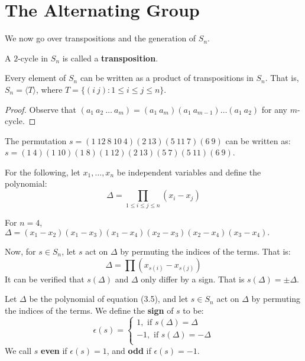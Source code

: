 \section{The Alternating Group}
\label{section_3.6}

We now go over transpositions and the generation of $S_n$.

\begin{definition}
  A $2$-cycle in  $S_n$ is called a \textbf{transposition}.
\end{definition}

\begin{lemma}\label{lemma_3.6.1}
  Every element of $S_n$ can be written as a product of transpositions in
  $S_n$. That is,  $S_n=\langle T \rangle $, where $T=\{(i \ j) : 1 \leq i \leq j \leq
  n\}$.
\end{lemma}
\begin{proof}
  Observe that $(a_1 \ a_2 \ \dots \ a_m)=(a_1 \ a_m)(a_1 \ a_{m-1}) \dots
  (a_1 \ a_2)$ for any $m$-cycle.
\end{proof}

\begin{example}\label{example_3.11}
  The permutation $s=(1 \ 12 \ 8  \ 10 \ 4)(2 \ 13)(5 \ 11 \ 7)(6 \ 9)$ can be
  written as: $s=(1 \ 4)(1 \ 10)(1 \ 8)(1 \ 12)(2 \ 13)(5 \ 7)(5 \ 11)(6 \
  9)$.
\end{example}

For the following, let $x_1, \dots, x_n$ be independent variables and define the
polynomial:
\begin{equation}
  \Delta=\prod_{1 \leq i \leq j \leq n}{(x_i-x_j)}
\end{equation}

\begin{example}\label{example_3.12}
  For $n=4$,  $\Delta=(x_1-x_2)(x_1-x_3)(x_1-x_4)(x_2-x_3)(x_2-x_4)(x_3-x_4).$
\end{example}

Now, for $s \in S_n$, let $s$ act on  $\Delta$ by permuting the indices of the
terms. That is:
\begin{equation*}
  \Delta=\prod{(x_{s(i)}-x_{s(j)})}
\end{equation*}
It can be verified that $s(\Delta)$ and $\Delta$ only differ by a sign. That is
$s(\Delta)=\pm\Delta$.

\begin{definition}
  Let $\Delta$ be the polynomial of equation (3.5), and let $s \in S_n$ act on
  $\Delta$ by permuting the indices of the terms. We define the
  \textbf{sign} of $s$ to be:
  \begin{equation}
    \epsilon(s)=\begin{cases}
      1, \text{ if } s(\Delta)=\Delta \\
      -1, \text{ if } s(\Delta)=-\Delta \\
    \end{cases}
  \end{equation}
  We call $s$  \textbf{even} if $\epsilon(s)=1$, and  \textbf{odd} if
  $\epsilon(s)=-1$.
\end{definition}

